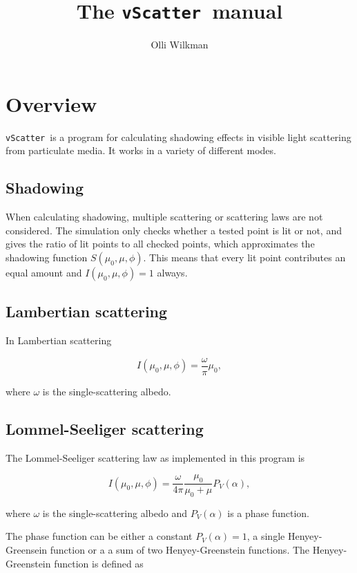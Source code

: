 \documentclass[a4paper]{article}
\newcommand{\this}[0]{\texttt{vScatter}}
\begin{document}
	
\title{The \this~manual}
\author{Olli Wilkman}

\maketitle

\tableofcontents

\section{Overview}

\this~is a program for calculating shadowing effects in visible light scattering from particulate media. It works in a variety of different modes.

\subsection{Shadowing}

When calculating shadowing, multiple scattering or scattering laws are not considered. The simulation only checks whether a tested point is lit or not, and gives the ratio of lit points to all checked points, which approximates the shadowing function $S(\mu_0, \mu, \phi)$. This means that every lit point contributes an equal amount and $I(\mu_0, \mu, \phi)=1$ always.

\subsection{Lambertian scattering}

In Lambertian scattering

\[
	I(\mu_0, \mu, \phi) = \frac{\omega}{\pi} \mu_0,
\]

where $\omega$ is the single-scattering albedo.



\subsection{Lommel-Seeliger scattering}\label{LommelSeeliger}

The Lommel-Seeliger scattering law as implemented in this program is

\[
	I(\mu_0, \mu, \phi) = \frac{\omega}{4 \pi} \frac{\mu_0}{\mu_0 + \mu} P_V(\alpha),
\]

where $\omega$ is the single-scattering albedo and $P_V(\alpha)$ is a phase function. 

The phase function can be either a constant $P_V(\alpha) = 1$, a single Henyey-Greensein function or a a sum of two Henyey-Greenstein functions. The Henyey-Greenstein function is defined as
\end{document}
